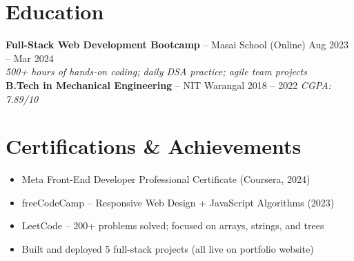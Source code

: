 \documentclass[10.5pt,a4paper]{article}
\begin{document}
\section{Education}
\textbf{Full-Stack Web Development Bootcamp} -- Masai School (Online) \hfill Aug 2023 -- Mar 2024\\
\textit{500+ hours of hands-on coding; daily DSA practice; agile team projects}\\[4pt]
\textbf{B.Tech in Mechanical Engineering} -- NIT Warangal \hfill 2018 -- 2022 \quad\textit{CGPA: 7.89/10}

\section{Certifications \& Achievements}
\begin{itemize}
    \item Meta Front-End Developer Professional Certificate (Coursera, 2024)
    \item freeCodeCamp -- Responsive Web Design + JavaScript Algorithms (2023)
    \item LeetCode -- 200+ problems solved; focused on arrays, strings, and trees
    \item Built and deployed 5 full-stack projects (all live on portfolio website)
\end{itemize}
\end{document}
